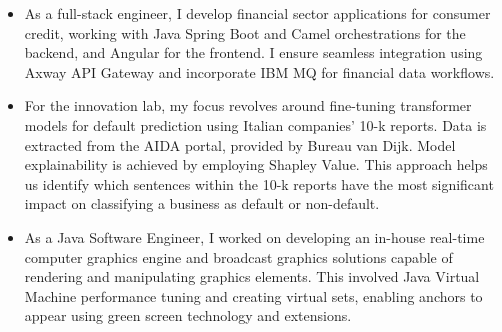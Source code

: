 \documentclass[10pt,a4paper,ragged2e]{altacv}
\begin{document}

\begin{fullwidth}
\makecvheader
\end{fullwidth}



\begin{itemize}
\item As a full-stack engineer, I develop financial sector applications for consumer credit, working with Java Spring Boot and Camel orchestrations for the backend, and Angular for the frontend. I ensure seamless integration using Axway API Gateway and incorporate IBM MQ for financial data workflows.
\item For the innovation lab, my focus revolves around fine-tuning transformer models for default prediction using Italian companies' 10-k reports. Data is extracted from the AIDA portal, provided by Bureau van Dijk. Model explainability is achieved by employing Shapley Value. This approach helps us identify which sentences within the 10-k reports have the most significant impact on classifying a business as default or non-default.
\end{itemize}

\divider

\begin{itemize}
\item As a Java Software Engineer, I worked on developing an in-house real-time computer graphics engine and broadcast graphics solutions capable of rendering and manipulating graphics elements. This involved Java Virtual Machine performance tuning and creating virtual sets, enabling anchors to appear using green screen technology and extensions.
\end{itemize}
\end{document}
